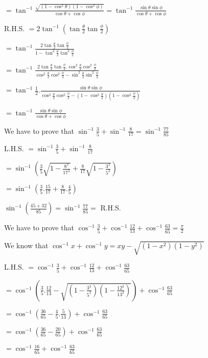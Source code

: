   $= \tan^{-1}\frac{\sqrt{(1 - \cos^2\theta)(1 - \cos^2\phi)}}{\cos\theta + \cos\phi} =
  \tan^{-1}\frac{\sin\theta\sin\phi}{\cos\theta + \cos\phi}$

  R.H.S. $= 2\tan^{-1}\left(\tan\frac{\theta}{2}\tan\frac{\phi}{2}\right)$

  $= \tan^{-1}\frac{2\tan\frac{\theta}{2}\tan\frac{\phi}{2}}{1 - \tan^2\frac{\theta}{2}\tan^2\frac{\phi}{2}}$

  $=\tan^{-1}\frac{2\tan\frac{\theta}{2}\tan\frac{\phi}{2}.\cos^2\frac{\theta}{2}\cos^2\frac{\phi}{2}}{\cos^2\frac{\theta}{2}\cos^2\frac{\phi}{2}
    - \sin^2\frac{\theta}{2}\sin^2\frac{\phi}{2}}$

  $= \tan^{-1}\frac{1}{2}.\frac{\sin\theta\sin\phi}{\cos^2\frac{\theta}{2}\cos^2\frac{\phi}{2} - \left(1 -
    \cos^2\frac{\theta}{2}\right)\left(1-\cos^2\frac{\phi}{2}\right)}$

  $= \tan^{-1}\frac{\sin\theta\sin\phi}{\cos\theta + \cos\phi}$

\item We have to prove that $\sin^{-1}\frac{3}{5} + \sin^{-1}\frac{8}{17} = \sin^{-1}\frac{77}{85}$

  L.H.S. $= \sin^{-1}\frac{3}{5} + \sin^{-1}\frac{8}{17}$

  $=\sin^{-1}\left(\frac{3}{5}\sqrt{1 - \frac{8^2}{17^2}} + \frac{8}{17}\sqrt{1 - \frac{3^2}{5^2}}\right)$

  $= \sin^{-1}\left(\frac{3}{5}.\frac{15}{17} + \frac{8}{17}.\frac{4}{5}\right)$

  $\sin^{-1}\left(\frac{45 + 32}{85}\right) = \sin^{-1}\frac{77}{85} =$ R.H.S.

\item We have to prove that $\cos^{-1}\frac{3}{5} + \cos^{-1}\frac{12}{13} + \cos^{-1}\frac{63}{65} = \frac{\pi}{2}$

  We know that $\cos^{-1}x + \cos^{-1}y = xy - \sqrt{(1 - x^2)(1 - y^2)}$

  L.H.S. $= \cos^{-1}\frac{3}{5} + \cos^{-1}\frac{12}{13} + \cos^{-1}\frac{63}{65}$

  $= \cos^{-1}\left(\frac{3}{5}.\frac{12}{13} - \sqrt{\left(1 - \frac{3^2}{5^2}\right)\left(1 -
    \frac{12^2}{13^2}\right)}\right) + \cos^{-1}\frac{63}{65}$

  $= \cos^{-1}\left(\frac{36}{65} - \frac{4}{5}.\frac{5}{13}\right) + \cos^{-1}\frac{63}{65}$

  $= \cos^{-1}\left(\frac{36}{65} - \frac{20}{65}\right) + \cos^{-1}\frac{63}{65}$

  $= \cos^{-1}\frac{16}{65} + \cos^{-1}\frac{63}{65}$

